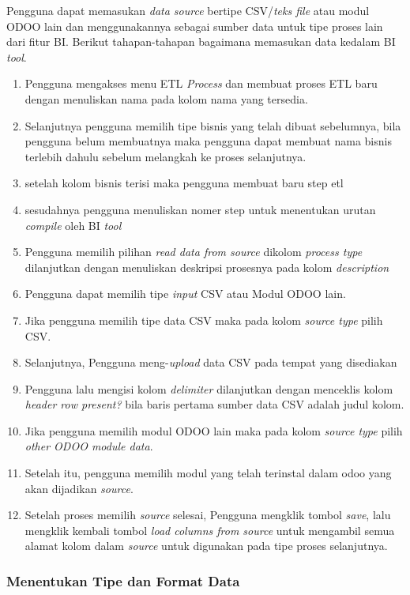 	Pengguna dapat memasukan \textit{data source} bertipe CSV/\textit{teks file} atau modul ODOO lain dan menggunakannya sebagai sumber data untuk
	tipe proses lain dari fitur BI. Berikut tahapan-tahapan bagaimana memasukan data kedalam BI \textit{tool}.
	\begin{enumerate}
		\item Pengguna mengakses menu ETL \textit{Process} dan membuat proses ETL baru dengan menuliskan nama pada kolom nama yang tersedia.
		\item Selanjutnya pengguna memilih tipe bisnis yang telah dibuat sebelumnya, bila pengguna belum membuatnya maka pengguna dapat membuat nama bisnis terlebih dahulu sebelum melangkah ke proses selanjutnya.
		\item setelah kolom bisnis terisi maka pengguna membuat baru step etl 
		\item sesudahnya pengguna menuliskan nomer step untuk menentukan urutan \textit{compile} oleh BI \textit{tool}
		\item Pengguna memilih pilihan \textit{read data from source} dikolom \textit{process type} dilanjutkan dengan menuliskan deskripsi prosesnya pada kolom \textit{description}
		\item Pengguna dapat memilih tipe \textit{input} CSV atau Modul ODOO lain.
		\item Jika pengguna memilih tipe data CSV maka pada kolom \textit{source type} pilih CSV.
		\item Selanjutnya, Pengguna meng-\textit{upload} data CSV pada tempat yang disediakan
		\item Pengguna lalu mengisi kolom \textit{delimiter} dilanjutkan dengan menceklis kolom \textit{header row present?} bila baris pertama sumber data CSV adalah judul kolom.
		\item Jika pengguna memilih modul ODOO lain maka pada kolom \textit{source type} pilih \textit{other ODOO module data}.
		\item Setelah itu, pengguna memilih modul yang telah terinstal dalam odoo yang akan dijadikan \textit{source}.
		\item Setelah proses memilih \textit{source} selesai, Pengguna mengklik tombol \textit{save}, lalu mengklik kembali tombol \textit{load columns from source} untuk mengambil semua alamat kolom dalam \textit{source} untuk digunakan pada tipe proses selanjutnya.
	\end{enumerate}
	
\subsubsection{Menentukan Tipe dan Format Data}


